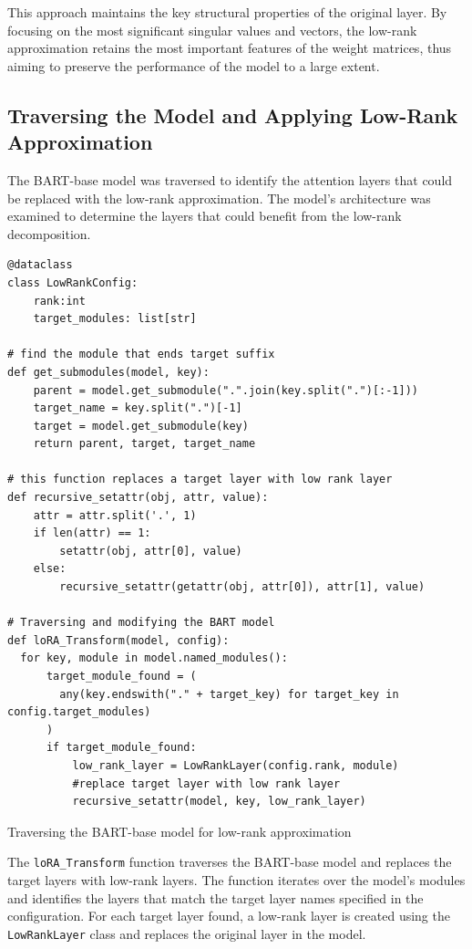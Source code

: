             This approach maintains the key structural properties of the original layer. By focusing on the most significant singular values and vectors, the low-rank approximation retains the most important features of the weight matrices, thus aiming to preserve the performance of the model to a large extent.

    \subsection{Traversing the Model and Applying Low-Rank Approximation}
        The BART-base model was traversed to identify the attention layers that could be replaced with the low-rank approximation. The model's architecture was examined to determine the layers that could benefit from the low-rank decomposition.
        \begin{listing}[H]
\begin{verbatim}
@dataclass
class LowRankConfig:
    rank:int
    target_modules: list[str]

# find the module that ends target suffix
def get_submodules(model, key):
    parent = model.get_submodule(".".join(key.split(".")[:-1]))
    target_name = key.split(".")[-1]
    target = model.get_submodule(key)
    return parent, target, target_name

# this function replaces a target layer with low rank layer
def recursive_setattr(obj, attr, value):
    attr = attr.split('.', 1)
    if len(attr) == 1:
        setattr(obj, attr[0], value)
    else:
        recursive_setattr(getattr(obj, attr[0]), attr[1], value)

# Traversing and modifying the BART model
def loRA_Transform(model, config):
  for key, module in model.named_modules():
      target_module_found = (
        any(key.endswith("." + target_key) for target_key in config.target_modules)
      )
      if target_module_found:
          low_rank_layer = LowRankLayer(config.rank, module)
          #replace target layer with low rank layer
          recursive_setattr(model, key, low_rank_layer)
\end{verbatim}
            \caption{Traversing the BART-base model for low-rank approximation}
            \label{listing:LoRA_Transform}
            \end{listing}
            
            The \texttt{loRA\_Transform} function traverses the BART-base model and replaces the target layers with low-rank layers. The function iterates over the model's modules and identifies the layers that match the target layer names specified in the configuration. For each target layer found, a low-rank layer is created using the \texttt{LowRankLayer} class and replaces the original layer in the model.

